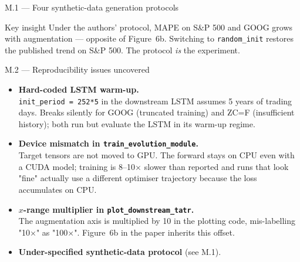 \documentclass[11pt,aspectratio=169]{beamer}
\begin{document}
\begin{frame}{M.1 --- Four synthetic-data generation protocols}
\vspace{1mm}
\begin{alertblock}{Key insight}
Under the authors' protocol, MAPE on S\&P 500 and GOOG \alert{grows} with augmentation ---
opposite of Figure~6b. Switching to \texttt{random\_init} restores the published trend on S\&P 500.
The protocol \emph{is} the experiment.
\end{alertblock}

\end{frame}

\begin{frame}{M.2 --- Reproducibility issues uncovered}
  \begin{itemize}\setlength\itemsep{4pt}
    \item \textbf{Hard-coded LSTM warm-up.}\\
      \texttt{init\_period = 252*5} in the downstream LSTM assumes 5 years of trading days.
      Breaks silently for GOOG (truncated training) and ZC=F (insufficient history); both run but evaluate the LSTM in its warm-up regime.
    \item \textbf{Device mismatch in \texttt{train\_evolution\_module}.}\\
      Target tensors are not moved to GPU. The forward stays on CPU even with a CUDA model; training is 8--10$\times$ slower than reported and runs that look "fine" actually use a different optimiser trajectory because the loss accumulates on CPU.
    \item \textbf{$x$-range multiplier in \texttt{plot\_downstream\_tatr}.}\\
      The augmentation axis is multiplied by 10 in the plotting code, mis-labelling "10$\times$" as "100$\times$". Figure~6b in the paper inherits this offset.
    \item \textbf{Under-specified synthetic-data protocol} (see M.1).
  \end{itemize}
\end{frame}
\end{document}
